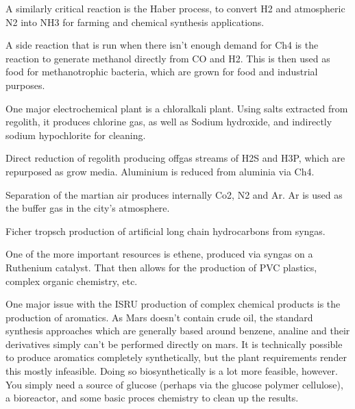 \documentclass[10pt]{article}
\begin{document}
A similarly critical reaction is the Haber process, to convert H2 and atmospheric N2 into NH3 for farming and chemical synthesis applications.

A side reaction that is run when there isn't enough demand for Ch4 is the reaction to generate methanol directly from CO and H2. This is then used as food for methanotrophic bacteria, which are grown for food and industrial purposes.

One major electrochemical plant is a chloralkali plant. Using salts extracted from regolith, it produces chlorine gas, as well as Sodium hydroxide, and indirectly sodium hypochlorite for cleaning.

Direct reduction of regolith producing offgas streams of H2S and H3P, which are repurposed as grow media. Aluminium is reduced from aluminia via Ch4.

Separation of the martian air produces internally Co2, N2 and Ar. Ar is used as the buffer gas in the city's atmosphere.

Ficher tropsch production of artificial long chain hydrocarbons from syngas.

One of the more important resources is ethene, produced via syngas on a Ruthenium catalyst. That then allows for the production of PVC plastics, complex organic chemistry, etc.

One major issue with the ISRU production of complex chemical products is the production of aromatics. As Mars doesn't contain crude oil, the standard synthesis approaches which are generally based around benzene, analine and their derivatives simply can't be performed directly on mars. It is technically possible to produce aromatics completely synthetically, but the plant requirements render this mostly infeasible. Doing so biosynthetically is a lot more feasible, however. You simply need a source of glucose (perhaps via the glucose polymer cellulose), a bioreactor, and some basic proces chemistry to clean up the results.
\end{document}
